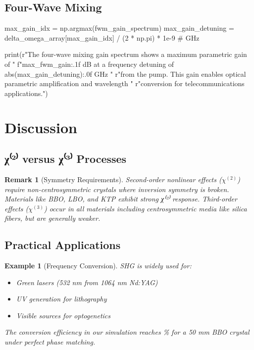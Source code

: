 \documentclass[a4paper, 11pt]{article}
\newtheorem{example}{Example}[section]
\newtheorem{remark}{Remark}[section]
\begin{document}
\subsection{Four-Wave Mixing}

\begin{pycode}
max_gain_idx = np.argmax(fwm_gain_spectrum)
max_gain_detuning = delta_omega_array[max_gain_idx] / (2 * np.pi) * 1e-9  # GHz

print(r"The four-wave mixing gain spectrum shows a maximum parametric gain of "
      f"{max_fwm_gain:.1f} dB at a frequency detuning of {abs(max_gain_detuning):.0f} GHz "
      r"from the pump. This gain enables optical parametric amplification and wavelength "
      r"conversion for telecommunications applications.")
\end{pycode}

\section{Discussion}

\subsection{χ⁽²⁾ versus χ⁽³⁾ Processes}

\begin{remark}[Symmetry Requirements]
Second-order nonlinear effects ($\chi^{(2)}$) require non-centrosymmetric crystals where
inversion symmetry is broken. Materials like BBO, LBO, and KTP exhibit strong χ⁽²⁾ response.
Third-order effects ($\chi^{(3)}$) occur in all materials including centrosymmetric media
like silica fibers, but are generally weaker.
\end{remark}

\subsection{Practical Applications}

\begin{example}[Frequency Conversion]
SHG is widely used for:
\begin{itemize}
\item Green lasers (532 nm from 1064 nm Nd:YAG)
\item UV generation for lithography
\item Visible sources for optogenetics
\end{itemize}
The conversion efficiency in our simulation reaches \%
for a 50 mm BBO crystal under perfect phase matching.
\end{example}
\end{document}
